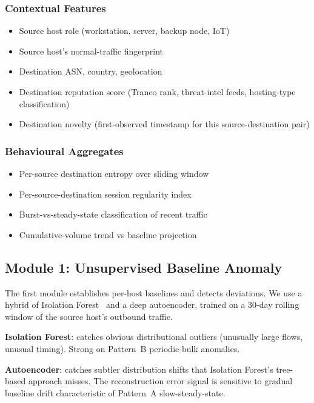 \documentclass[sigconf,nonacm]{acmart}
\begin{document}
\subsubsection{Contextual Features}

\begin{itemize}
  \item Source host role (workstation, server, backup node, IoT)
  \item Source host's normal-traffic fingerprint
  \item Destination ASN, country, geolocation
  \item Destination reputation score (Tranco rank, threat-intel
        feeds, hosting-type classification)
  \item Destination novelty (first-observed timestamp for this
        source-destination pair)
\end{itemize}

\subsubsection{Behavioural Aggregates}

\begin{itemize}
  \item Per-source destination entropy over sliding window
  \item Per-source-destination session regularity index
  \item Burst-vs-steady-state classification of recent traffic
  \item Cumulative-volume trend vs baseline projection
\end{itemize}

\subsection{Module 1: Unsupervised Baseline Anomaly}

The first module establishes per-host baselines and detects deviations.
We use a hybrid of Isolation Forest~\cite{liu2008iforest} and a
deep autoencoder, trained on a 30-day rolling window of the source
host's outbound traffic.

\textbf{Isolation Forest}: catches obvious distributional outliers
(unusually large flows, unusual timing). Strong on Pattern~B
periodic-bulk anomalies.

\textbf{Autoencoder}: catches subtler distribution shifts that
Isolation Forest's tree-based approach misses. The reconstruction
error signal is sensitive to gradual baseline drift characteristic of
Pattern~A slow-steady-state.
\end{document}
